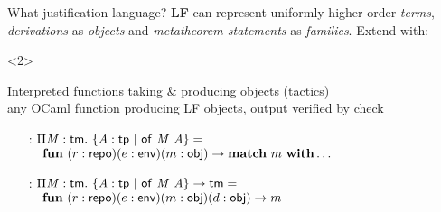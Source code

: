 \documentclass{beamer}
\theoremstyle{example}
\begin{document}
\begin{frame}{What justification language?}
  \textbf{LF} can represent uniformly higher-order \emph{terms},
  \emph{derivations} as \emph{objects} and \emph{metatheorem
    statements} as \emph{families}. \pause Extend with:
  \begin{overlayarea}\textwidth{18em}
    \begin{onlyenv}<2>
      \begin{block}{Interpreted functions} taking \& producing objects (tactics) \\
        {\footnotesize any OCaml function producing LF objects, output
          verified by \textsf{check}}
        \begin{example}
          \begin{enumerate}[inline]
          \item[\const{infer} :] $\Pi{\ensuremath{\text{\textit{M}}}}:{\text{\textsf{tm}}}.\ 
            \{{\text{\textit{A}}}:{\text{\textsf{tp}}}\ |\ {{\text{\textsf{of}}}\ {\text{\textit{M}}}\ {\text{\textit{A}}}}\} =$ \\
            {\small$\quad\mathbf{fun}\ (r : \text{\textsf{repo}}) (e :
              \text{\textsf{env}}) (m : \text{\textsf{obj}}) \to \mathbf{match}\ m\
              \mathbf{with} \ldots$}
            \\[1em]

          \item[\const{get} :] $\Pi{\ensuremath{\text{\textit{M}}}}:{\text{\textsf{tm}}}.\  \{{\text{\textit{A}}}:{\text{\textsf{tp}}}\ |\ {{\text{\textsf{of}}}\ {\text{\textit{M}}}\ {\text{\textit{A}}}}\}
            \to \text{\textsf{tm}}=$ \\
            {\small$\quad\mathbf{fun}\ (r : \text{\textsf{repo}}) (e :
              \text{\textsf{env}}) (m : \text{\textsf{obj}}) (d : \text{\textsf{obj}})\to m$}
            \\[1em]


\end{enumerate}
\end{example}
\end{block}
\end{onlyenv}
\end{overlayarea}
\end{frame}
\end{document}
